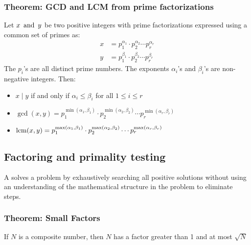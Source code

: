 \subsubsection*{Theorem: GCD and LCM from prime factorizations}
Let $x \operatorname{~\text{and}~} y$ be two positive integers with prime factorizations expressed using a common set of primes as:
\begin{align*}
  x & = p_1^{\alpha_1} \cdot p_2^{\alpha_2} \cdots p_r^{\alpha_r} \\
  y & = p_1^{\beta_1} \cdot p_2^{\beta_2} \cdots p_r^{\beta_r}
\end{align*}
The $p_i$'s are all distinct prime numbers. The exponents $\alpha_i$'s and $\beta_i$'s are non-negative integers. Then:
\begin{itemize}
  \item $x \mid y$ if and only if $\alpha_i \leq \beta_i$ for all $1 \leq i \leq r$
  \item $\gcd(x,y) = p_1^{\min(\alpha_1,\beta_1)} \cdot p_2^{\min(\alpha_2,\beta_2)} \cdots p_r^{\min(\alpha_r,\beta_r)}$
  \item $\operatorname{\text{lcm}}(x,y) = p_1^{\max(\alpha_1,\beta_1)} \cdot p_2^{\max(\alpha_2,\beta_2)} \cdots p_r^{\max(\alpha_r,\beta_r)}$
\end{itemize}

\subsection{Factoring and primality testing}
A  solves a problem by exhaustively searching all positive solutions without using an understanding of the mathematical structure in the problem to eliminate steps.

\subsubsection*{Theorem: Small Factors}
If $N$ is a composite number, then $N$ has a factor greater than 1 and at most $\sqrt{N}$

